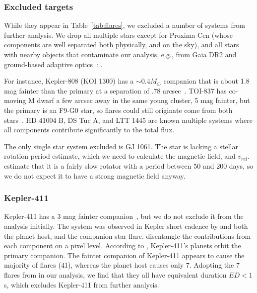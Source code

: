 \documentclass[twocolumn]{aastex631}
\begin{document}
\subsubsection{Excluded targets}
\label{sec:results:individualstars:excluded}

While they appear in Table~\ref{tab:flares}, we excluded a number of systems from further analysis. We drop all multiple stars except for Proxima Cen (whose components are well separated both physically, and on the sky), and all stars with nearby objects that contaminate our analysis, e.g., from Gaia DR2 and ground-based adaptive optics~\citep{ziegler2018measuring}: .

For instance, Kepler-808 (KOI 1300) has a $\sim0.4M_\odot$ \citep{kraus2016impact} companion that is about 1.8 mag fainter than the primary at a separation of .78 arcsec~\citep{baranec2016roboao}. TOI-837 has co-moving M dwarf a few arcsec away in the same young cluster, 5 mag fainter, but the primary is an F9-G0 star, so flares could still originate come from both stars~\citep{bouma2020cluster}. HD 41004 B, DS Tuc A, and LTT 1445 are known multiple systems where all components contribute significantly to the total flux.

The only single star system excluded is GJ 1061. The star is lacking a stellar rotation period estimate, which we need to calculate the magnetic field, and $v_{rel}$. \citet{dreizler2020reddots} estimate that it is a fairly slow rotator with a period between 50 and 200 days, so we do not expect it to have a strong magnetic field anyway.

\subsubsection{Kepler-411}
\label{sec:results:individualstars:kep411}
Kepler-411 has a 3 mag fainter companion~\citep{wang2014influence,ziegler2018measuring}, but we do not exclude it from the analysis initially. The system was observed in Kepler short cadence by \citet{jackman2021stellara} and both the planet host, and the companion star flare. \citet{jackman2021stellara} disentangle the contributions from each component on a pixel level. According to \citet{morton2016false, sun2019kepler411}, Kepler-411's planets orbit the primary companion. The fainter companion of Kepler-411 appears to cause the majority of flares (41), whereas the planet host causes only 7. Adopting the 7 flares from \cite{jackman2021stellara} in our analysis, we find that they all have equivalent duration $ED<1\,$s, which excludes Kepler-411 from further analysis.
\end{document}
